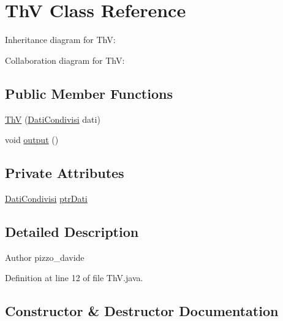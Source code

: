 \hypertarget{classcampane_1_1_th_v}{}\section{ThV Class Reference}
\label{classcampane_1_1_th_v}


Inheritance diagram for ThV\+:


Collaboration diagram for ThV\+:
\subsection*{Public Member Functions}
\begin{DoxyCompactItemize}
\item 
\hyperlink{classcampane_1_1_th_v_ac4bdb67b90f2abbff0c2d247adbb58d4}{ThV} (\hyperlink{classcampane_1_1_dati_condivisi}{Dati\+Condivisi} dati)
\item 
void \hyperlink{classcampane_1_1_th_v_a7437b254e19e7e12fc2ec99945f4ecea}{output} ()
\end{DoxyCompactItemize}
\subsection*{Private Attributes}
\begin{DoxyCompactItemize}
\item 
\hyperlink{classcampane_1_1_dati_condivisi}{Dati\+Condivisi} \hyperlink{classcampane_1_1_th_v_af3ade885f29d5a10bb194e8e3e1480c5}{ptr\+Dati}
\end{DoxyCompactItemize}


\subsection{Detailed Description}
\begin{DoxyAuthor}{Author}
pizzo\+\_\+davide 
\end{DoxyAuthor}


Definition at line 12 of file Th\+V.\+java.



\subsection{Constructor \& Destructor Documentation}
\mbox{\label{classcampane_1_1_th_v_ac4bdb67b90f2abbff0c2d247adbb58d4}} 

